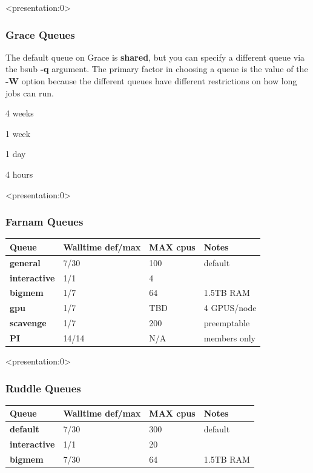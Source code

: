 \documentclass[10pt]{beamer}
\begin{document}
\begin{frame}<presentation:0>
\frametitle{Grace Queues}
The default queue on Grace is \textbf{shared}, but you can specify
a different queue via the bsub \textbf{-q} argument.
The primary factor in choosing a queue is the value of the \textbf{-W}
option because the different queues have different restrictions on how
long jobs can run.

\vskip10pt
\begin{description}[interactive]
\item[long]                  4 weeks
\item[week]                  1 week
\item[shared]                1 day
\item[interactive]           4 hours
\end{description}

\end{frame}

\begin{frame}<presentation:0>

\frametitle{Farnam Queues}

\begin{tabular}{|l|l|l|l|}
\hline
\textbf{Queue} & \textbf{Walltime def/max}& \textbf{MAX cpus} & \textbf{Notes} \\
\hline
\textbf{general} & 7/30 &  100 & default \\
\hline
\textbf{interactive} & 1/1 & 4 &  \\
\hline
\textbf{bigmem} & 1/7 & 64 & 1.5TB RAM \\
\hline
\textbf{gpu} & 1/7 & TBD & 4 GPUS/node \\
\hline
\textbf{scavenge} & 1/7 & 200 & preemptable \\
\hline
\textbf{PI} & 14/14 & N/A & members only \\
\hline
\end{tabular}

\end{frame}

\begin{frame}<presentation:0>
\frametitle{Ruddle Queues}

\begin{tabular}{|l|l|l|l|}
\hline
\textbf{Queue} & \textbf{Walltime def/max}& \textbf{MAX cpus} & \textbf{Notes} \\
\hline
\textbf{default} & 7/30 &  300 & default \\
\hline
\textbf{interactive} & 1/1 & 20 &  \\
\hline
\textbf{bigmem} & 7/30 & 64 & 1.5TB RAM \\
\hline
\end{tabular}

\end{frame}
\end{document}
